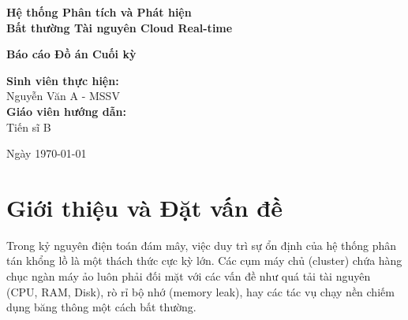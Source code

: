 \documentclass[12pt,a4paper]{article}
\begin{document}
\begin{titlepage}
    \centering
    \vspace*{2cm}
    
    {\Huge \bfseries Hệ thống Phân tích và Phát hiện\\[0.5cm] Bất thường Tài nguyên Cloud Real-time\par}
    \vspace{1.5cm}
    
    {\Large \textbf{Báo cáo Đồ án Cuối kỳ}\par}
    \vspace{2cm}
    
    {\large
    \textbf{Sinh viên thực hiện:}\\
    Nguyễn Văn A - MSSV\\[0.5cm]
    \textbf{Giáo viên hướng dẫn:}\\
    Tiến sĩ B\par}
    
    \vfill
    
    {\large Ngày \today\par}
\end{titlepage}

\newpage
\tableofcontents
\newpage

\section{Giới thiệu và Đặt vấn đề}

Trong kỷ nguyên điện toán đám mây, việc duy trì sự ổn định của hệ thống phân tán khổng lồ là một thách thức cực kỳ lớn. Các cụm máy chủ (cluster) chứa hàng chục ngàn máy ảo luôn phải đối mặt với các vấn đề như quá tải tài nguyên (CPU, RAM, Disk), rò rỉ bộ nhớ (memory leak), hay các tác vụ chạy nền chiếm dụng băng thông một cách bất thường.
\end{document}
